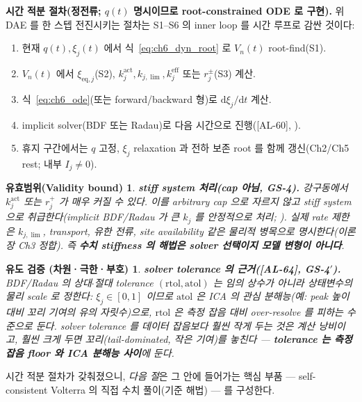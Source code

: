 \documentclass[11pt,a4paper]{article}
\newtheorem*{boundbox}{유효범위(Validity bound)}
\newtheorem*{verifybox}{유도 검증 (차원·극한·부호)}
\newcommand{\dd}{\mathrm{d}}
\newcommand{\eff}{\mathrm{eff}}
\newcommand{\eq}{\mathrm{eq}}
\newcommand{\AL}[1]{\textsf{[AL-#1]}}
\begin{document}
\textbf{시간 적분 절차(정전류; $q(t)$ 명시이므로 root-constrained ODE 로 구현).} 위 DAE 를 한 스텝 전진시키는
절차는 S1--S6 의 inner loop 를 시간 루프로 감싼 것이다:
\begin{enumerate}[label=T\arabic*),leftmargin=2.4em]
\item 현재 $q(t),\xi_j(t)$ 에서 식~\eqref{eq:ch6_dyn_root} 로 $V_n(t)$ root-find(S1).
\item $V_n(t)$ 에서 $\xi_{\eq,j}$(S2), $k_j^{\mathrm{act}},k_{j,\lim},k_j^{\eff}$ 또는 $r_j^\pm$(S3) 계산.
\item 식~\eqref{eq:ch6_ode}(또는 forward/backward 형)로 $\dd\xi_j/\dd t$ 계산.
\item implicit solver(BDF 또는 Radau)로 다음 시간으로 진행(\AL{60}, \cite{hindmarsh2005}).
\item 휴지 구간에서는 $q$ 고정, $\xi_j$ relaxation 과 전하 보존 root 를 함께 갱신(Ch2/Ch5 rest; 내부 $I_j\ne0$).
\end{enumerate}
\begin{boundbox}
\textbf{stiff system 처리(cap 아님, GS-4).} 강구동에서 $k_j^{\mathrm{act}}$ 또는 $r_j^+$ 가 매우 커질 수 있다.
이를 arbitrary cap 으로 자르지 않고 \emph{stiff system} 으로 취급한다(implicit BDF/Radau 가 큰 $k_j$ 를 안정적으로
처리; \cite{brenan1996,hindmarsh2005}). 실제 rate 제한은 $k_{j,\lim}$, transport, 유한 전류, site availability
같은 물리적 병목으로 명시한다(이론장 Ch3 정합). 즉 \textbf{수치 stiffness 의 해법은 solver 선택이지 모델
변형이 아니다}.
\end{boundbox}
\begin{verifybox}
\textbf{solver tolerance 의 근거(\AL{64}, GS-4$'$).} BDF/Radau 의 상대$\cdot$절대 tolerance $(\mathrm{rtol},
\mathrm{atol})$ 는 임의 상수가 아니라 상태변수의 물리 scale 로 정한다: $\xi_j\in[0,1]$ 이므로 $\mathrm{atol}$ 은
ICA 의 관심 분해능(예: peak 높이 대비 꼬리 기여의 유의 자릿수)으로, $\mathrm{rtol}$ 은 측정 잡음 대비 over-resolve
를 피하는 수준으로 둔다. solver tolerance 를 데이터 잡음보다 훨씬 작게 두는 것은 계산 낭비이고, 훨씬 크게 두면
꼬리(tail-dominated, 작은 기여)를 놓친다 — \textbf{tolerance 는 측정 잡음 floor 와 ICA 분해능 사이}에 둔다.
\end{verifybox}

시간 적분 절차가 갖춰졌으니, \emph{다음 절}은 그 안에 들어가는 핵심 부품 — self-consistent Volterra 의 직접 수치
풀이(기준 해법) — 를 구성한다.

\end{document}
